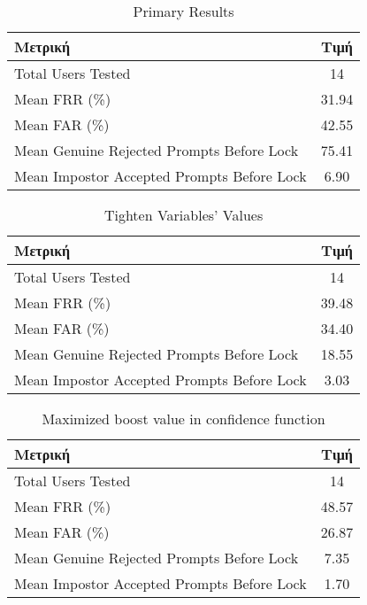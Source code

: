 \begin{table}[H]
\centering
\begin{tabular}{|l|c|}
\hline
\textbf{Μετρική}                                 & \textbf{Τιμή}   \\ \hline
Total Users Tested                               & 14             \\ \hline
Mean FRR (\%)                                    & 31.94          \\ \hline
Mean FAR (\%)                                    & 42.55          \\ \hline
Mean Genuine Rejected Prompts Before Lock       & 75.41          \\ \hline
Mean Impostor Accepted Prompts Before Lock      & 6.90           \\ \hline
\end{tabular}
\caption{Primary Results}
\label{tab:chapter5_primaryResults}
\end{table}

\begin{table}[H]
\centering
\begin{tabular}{|l|c|}
\hline
\textbf{Μετρική}                                 & \textbf{Τιμή}   \\ \hline
Total Users Tested                               & 14             \\ \hline
Mean FRR (\%)                                    & 39.48          \\ \hline
Mean FAR (\%)                                    & 34.40          \\ \hline
Mean Genuine Rejected Prompts Before Lock       & 18.55          \\ \hline
Mean Impostor Accepted Prompts Before Lock      & 3.03           \\ \hline
\end{tabular}
\caption{Tighten Variables' Values}
\label{tab:chapter5_tighten}
\end{table}

\begin{table}[H]
\centering
\begin{tabular}{|l|c|}
\hline
\textbf{Μετρική}                                 & \textbf{Τιμή}   \\ \hline
Total Users Tested                               & 14             \\ \hline
Mean FRR (\%)                                    & 48.57          \\ \hline
Mean FAR (\%)                                    & 26.87          \\ \hline
Mean Genuine Rejected Prompts Before Lock       & 7.35           \\ \hline
Mean Impostor Accepted Prompts Before Lock      & 1.70           \\ \hline
\end{tabular}
\caption{Maximized boost value in confidence function}
\label{tab:chapter5_boostValues}
\end{table}

